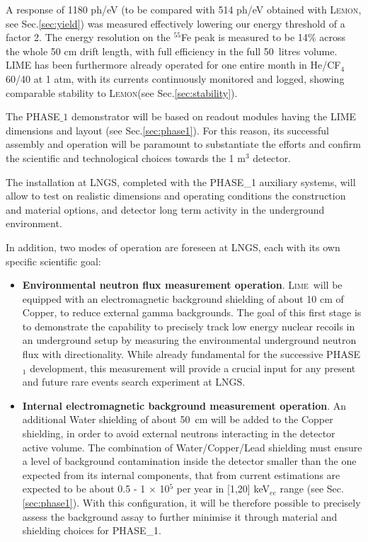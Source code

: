 \documentclass[physics,article,submit,moreauthors,pdftex]{Definitions/mdpi}
\newcommand{\lemon}{{\textsc{Lemon}}\xspace}
\newcommand{\lime}{{\textsc{Lime}}\xspace}
\begin{document}
A response of 1180 ph/eV (to be compared with 514 ph/eV obtained with \lemon, see Sec.\ref{sec:yield}) was measured effectively lowering our energy threshold of a factor 2. The energy resolution on the $^{55}$Fe peak is measured to be 14$\%$ across the whole 50 cm drift length, with full efficiency in the full 50~litres volume. LIME has been furthermore already operated for one entire month in He/CF$_4$ 60/40 at 1 atm, with its currents continuously monitored and logged, showing comparable stability to \lemon (see Sec.\ref{sec:stability}).

The PHASE$\_1$ demonstrator will be based on readout modules having the LIME dimensions and layout (see Sec.\ref{sec:phase1}). For this reason, its successful assembly and operation will be paramount to substantiate the efforts and confirm the scientific and technological choices towards the 1 m$^3$ detector. 

The installation at LNGS, completed with the PHASE\_1 auxiliary systems, will allow to test on realistic dimensions and operating conditions the construction and material options, and detector long term activity in the underground environment. 

In addition, two modes of operation  are foreseen at LNGS, each with its own specific scientific goal:

\begin{itemize}
    \item {\bf Environmental neutron flux measurement operation}. \lime~will be equipped with an electromagnetic background shielding of about 10 cm of Copper, to reduce external gamma backgrounds. The goal of this first stage is to demonstrate the capability to precisely track low energy nuclear recoils in an underground setup by measuring the environmental underground neutron flux with directionality. While already  fundamental for the successive PHASE$_1$ development, this measurement will provide a crucial input for any present and future rare events search experiment at LNGS.
    \item {\bf Internal electromagnetic background measurement operation}. An additional Water shielding of about 50~cm will be added to the Copper shielding, in order to avoid external neutrons interacting in the detector active volume. The combination of Water/Copper/Lead shielding must ensure a level of background contamination inside the detector smaller than the one expected from its internal components, that from current estimations are expected to be about 0.5 - 1 $\times$ 10$^5$ per year in [1,20] keV$_{ee}$ range (see Sec.\ref{sec:phase1}). With this configuration, it will be therefore possible to precisely assess the background assay to further minimise it through material and shielding choices for PHASE\_1. 
\end{itemize}
\end{document}
